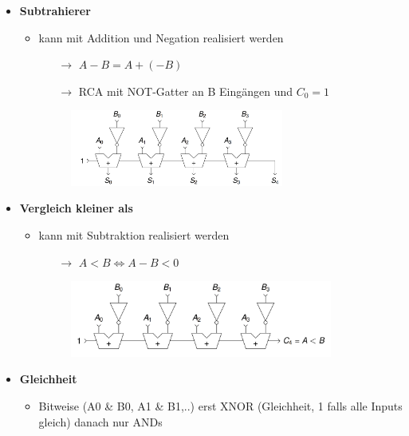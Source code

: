 \documentclass[11pt,a4paper]{article}
\begin{document}
\begin{itemize}
\item \textbf{Subtrahierer}
	\begin{itemize}
	\item kann mit Addition und Negation realisiert werden
		\begin{itemize}
		\item[$\rightarrow$] $A-B = A+ (-B)$
		\item[$\rightarrow$] RCA mit NOT-Gatter an B Eingängen und $C_0 = 1$
		\end{itemize}
	\item[]
		\begin{figure}[H]
		\begin{center}
		\includegraphics[height=2.5cm]{subtrahierer}
		\end{center}
		\end{figure}
	\end{itemize}
	
\item \textbf{Vergleich kleiner als}
	\begin{itemize}
	\item kann mit Subtraktion realisiert werden
		\begin{itemize}
		\item[$\rightarrow$] $A < B \Leftrightarrow A-B <0$
		\end{itemize}
	\item[]
		\begin{figure}[H]
		\begin{center}
		\includegraphics[height=2.5cm]{kleinerals}
		\end{center}
		\end{figure}
	\end{itemize}

\item \textbf{Gleichheit}
	\begin{itemize}
	\item Bitweise (A0 \& B0, A1 \& B1,..) erst XNOR (Gleichheit, 1 falls alle Inputs gleich) danach nur ANDs
	\end{itemize}


\end{itemize}
\end{document}
